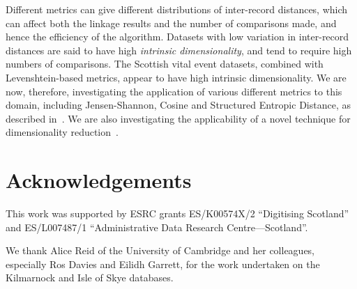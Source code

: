 \documentclass{llncs}
\begin{document}
Different metrics can give different distributions of inter-record
distances, which can affect both the linkage results and the number of
comparisons made, and hence the efficiency of the algorithm. Datasets
with low variation in inter-record distances are said to have high
\textit{intrinsic dimensionality}, and tend to require high numbers of
comparisons. The Scottish vital event datasets, combined with
Levenshtein-based metrics, appear to have high intrinsic dimensionality.
We are now, therefore, investigating the application of various
different metrics to this domain, including Jensen-Shannon, Cosine and
Structured Entropic Distance, as described in~\cite{Connor2016}. We are
also investigating the applicability of a novel technique for
dimensionality reduction~\cite{Connor2017}.


\section{Acknowledgements}

This work was supported by ESRC grants ES/K00574X/2 ``Digitising Scotland''
and ES/L007487/1 ``Administrative Data Research Centre---Scotland''.

We thank Alice Reid of the University of Cambridge and her colleagues,
especially Ros Davies and Eilidh Garrett, for the work undertaken on the
Kilmarnock and Isle of Skye databases.



 

\end{document}
